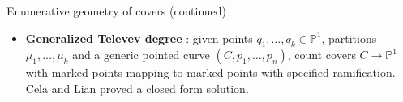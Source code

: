 \documentclass{beamer}
\renewcommand{\P}{\mathbb P}
\theoremstyle{definition}
\begin{document}
                                                                                                                                                                                                                          \begin{frame}{Enumerative geometry of covers (continued)}
                                                                                                                                                                                                                            \begin{itemize}
                                                                                                                                                                                                                            \item {\bf Generalized Televev degree} \cite{Generalized}: given points $q_1,\dots,q_k\in\P^1$,
                                                                                                                                                                                                                              partitions $\mu_1,\dots,\mu_k$ and a generic pointed curve
                                                                                                                                                                                                                              $(C,p_1,\dots,p_n)$, count covers $C\to\P^1$ with marked points mapping to marked points
                                                                                                                                                                                                                              with specified ramification. Cela and Lian proved a closed form solution.
                                                                                                                                                                                                                            \end{itemize}


\end{frame}
\end{document}
